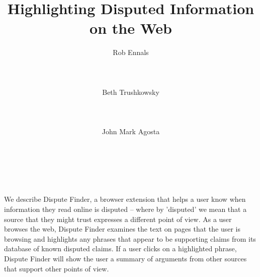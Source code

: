 \documentclass{www2010-submission}
\begin{document}
\toappear



\title{Highlighting Disputed Information on the Web}



\author{
\alignauthor Rob Ennals\\
       \\
       \\
       \\
\alignauthor Beth Trushkowsky\\
       \\
       \\
       \\
\alignauthor John Mark Agosta\\
       \\
       \\
       \\
}



\maketitle



\abstract

We describe Dispute Finder, a browser extension that helps a user know when information they read online is disputed -- where by 'disputed' we mean that a source that they might trust expresses a different point of view.  As a user browses the web, Dispute Finder examines the text on pages that the user is browsing and highlights any phrases that appear to be supporting claims from its database of known disputed claims. If a user clicks on a highlighted phrase, Dispute Finder will show the user a summary of arguments from other sources that support other points of view.
\end{document}
